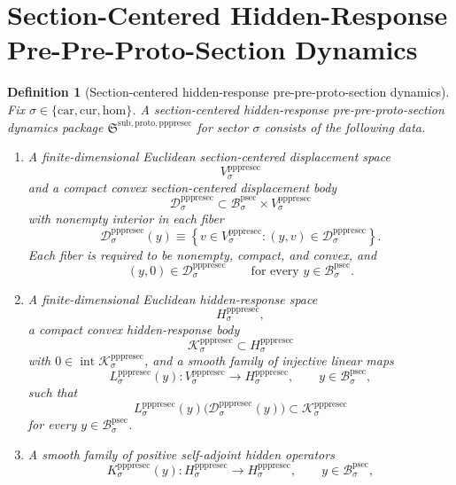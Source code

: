 \documentclass[11pt]{article}
\newcommand{\Car}{\mathrm{car}}
\newcommand{\Cur}{\mathrm{cur}}
\newcommand{\Hom}{\mathrm{hom}}
\newcommand{\ProtoSectionBody}[1]{\mathcal B_{#1}^{\mathrm{psec}}}
\newcommand{\PrePreProtoSectionPackage}{\mathfrak S^{\mathrm{sub,proto,pppresec}}}
\newcommand{\PrePreProtoSectionVertical}[1]{V_{#1}^{\mathrm{pppresec}}}
\newcommand{\PrePreProtoSectionResidualBody}[1]{\mathcal D_{#1}^{\mathrm{pppresec}}}
\newcommand{\PrePreProtoSectionHidden}[1]{H_{#1}^{\mathrm{pppresec}}}
\newcommand{\PrePreProtoSectionHiddenBody}[1]{\mathcal K_{#1}^{\mathrm{pppresec}}}
\newcommand{\PrePreProtoSectionResponseMap}[1]{L_{#1}^{\mathrm{pppresec}}}
\newcommand{\PrePreProtoSectionOperator}[1]{K_{#1}^{\mathrm{pppresec}}}
\newtheorem{definition}{Definition}
\begin{document}
\section{Section-Centered Hidden-Response Pre-Pre-Proto-Section Dynamics}

\begin{definition}[Section-centered hidden-response pre-pre-proto-section dynamics]
\label{def:deeppackage}
Fix \(\sigma\in\{\Car,\Cur,\Hom\}\). A \emph{section-centered hidden-response pre-pre-proto-section dynamics package} \(\PrePreProtoSectionPackage\) for sector \(\sigma\) consists of the following data.
\begin{enumerate}
    \item A finite-dimensional Euclidean section-centered displacement space
    \[
    \PrePreProtoSectionVertical{\sigma}
    \]
    and a compact convex section-centered displacement body
    \[
    \PrePreProtoSectionResidualBody{\sigma}
    \subset
    \ProtoSectionBody{\sigma}\times\PrePreProtoSectionVertical{\sigma}
    \]
    with nonempty interior in each fiber
    \[
    \PrePreProtoSectionResidualBody{\sigma}(y)
    \equiv
    \left\{
    v\in\PrePreProtoSectionVertical{\sigma}:(y,v)\in\PrePreProtoSectionResidualBody{\sigma}
    \right\}.
    \]
    Each fiber is required to be nonempty, compact, and convex, and
    \[
    (y,0)\in\PrePreProtoSectionResidualBody{\sigma}
    \qquad
    \text{for every }
    y\in\ProtoSectionBody{\sigma}.
    \]
    \item A finite-dimensional Euclidean hidden-response space
    \[
    \PrePreProtoSectionHidden{\sigma},
    \]
    a compact convex hidden-response body
    \[
    \PrePreProtoSectionHiddenBody{\sigma}
    \subset
    \PrePreProtoSectionHidden{\sigma}
    \]
    with \(0\in\operatorname{int}\PrePreProtoSectionHiddenBody{\sigma}\), and a smooth family of injective linear maps
    \[
    \PrePreProtoSectionResponseMap{\sigma}(y):
    \PrePreProtoSectionVertical{\sigma}\to\PrePreProtoSectionHidden{\sigma},
    \qquad
    y\in\ProtoSectionBody{\sigma},
    \]
    such that
    \[
    \PrePreProtoSectionResponseMap{\sigma}(y)\bigl(\PrePreProtoSectionResidualBody{\sigma}(y)\bigr)
    \subset
    \PrePreProtoSectionHiddenBody{\sigma}
    \]
    for every \(y\in\ProtoSectionBody{\sigma}\).
    \item A smooth family of positive self-adjoint hidden operators
    \[
    \PrePreProtoSectionOperator{\sigma}(y):
    \PrePreProtoSectionHidden{\sigma}\to\PrePreProtoSectionHidden{\sigma},
    \qquad
    y\in\ProtoSectionBody{\sigma},
\]
\end{enumerate}
\end{definition}
\end{document}
